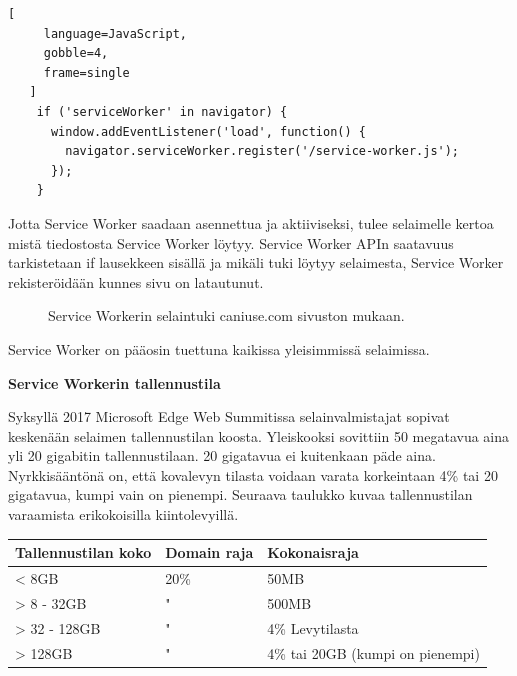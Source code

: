 \documentclass{tktltiki}
\begin{document}
\begin{lstlisting}[
     language=JavaScript,
     gobble=4,
     frame=single
   ]
    if ('serviceWorker' in navigator) {
      window.addEventListener('load', function() {
        navigator.serviceWorker.register('/service-worker.js');
      });
    }
\end{lstlisting}

Jotta Service Worker saadaan asennettua ja aktiiviseksi, tulee selaimelle kertoa mistä tiedostosta Service Worker löytyy. Service Worker APIn saatavuus tarkistetaan if lausekkeen sisällä ja mikäli tuki löytyy selaimesta, Service Worker rekisteröidään kunnes sivu on latautunut. 

\begin{figure}[h]
\begin{center}
\caption{Service Workerin selaintuki caniuse.com sivuston mukaan. }
\label{Service workerin selaintuki}
\end{center}
\end{figure}


Service Worker on pääosin tuettuna kaikissa yleisimmissä selaimissa. 

\textbf{Service Workerin tallennustila}

Syksyllä 2017 Microsoft Edge Web Summitissa selainvalmistajat sopivat keskenään selaimen tallennustilan koosta. \cite{Love} Yleiskooksi sovittiin 50 megatavua aina yli 20 gigabitin tallennustilaan. 20 gigatavua ei kuitenkaan päde aina. Nyrkkisääntönä on, että kovalevyn tilasta voidaan varata korkeintaan 4\% tai 20 gigatavua, kumpi vain on pienempi. Seuraava taulukko kuvaa tallennustilan varaamista erikokoisilla kiintolevyillä.

\begin{table}[!ht]
\begin{center}
  \begin{tabular}{|L{5cm}|L{5cm}|L{5cm}|}
    \hline
    \textbf{Tallennustilan koko} & 
    \textbf{Domain raja} &
    \textbf{Kokonaisraja}
    \\ \hline
    < 8GB & 20\% & 50MB \\ \hline
    > 8 - 32GB & " & 500MB \\ \hline
    > 32 - 128GB & " & 4\% Levytilasta \\ \hline
    > 128GB & " & 4\% tai 20GB (kumpi on pienempi) \\
    \hline
  \end{tabular}
\end{center}
\label{table:selaimentallennustila}
\end{table}
\end{document}
